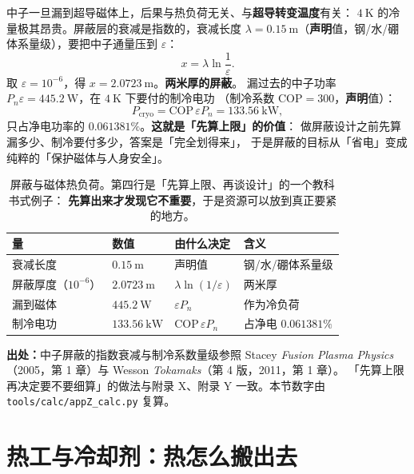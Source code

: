 中子一旦漏到超导磁体上，后果与热负荷无关、与\textbf{超导转变温度}有关：
$4\ \mathrm{K}$ 的冷量极其昂贵。屏蔽层的衰减是指数的，衰减长度
$\lambda=0.15\ \mathrm{m}$（\textbf{声明}值，钢/水/硼体系量级），要把中子通量压到 $\varepsilon$：
\begin{equation}
x = \lambda\ln\frac{1}{\varepsilon}.
\label{eq:app-z-shield}
\end{equation}
取 $\varepsilon=10^{-6}$，得 $x = 2.0723\ \mathrm{m}$。\textbf{两米厚的屏蔽}。
漏过去的中子功率 $P_n\varepsilon = 445.2\ \mathrm{W}$，在 $4\ \mathrm{K}$ 下要付的制冷电功
（制冷系数 $\mathrm{COP}=300$，\textbf{声明}值）：
\begin{equation}
P_{\mathrm{cryo}} = \mathrm{COP}\,\varepsilon P_n = 133.56\ \mathrm{kW},
\label{eq:app-z-cryo}
\end{equation}
只占净电功率的 $0.061381\%$。\textbf{这就是「先算上限」的价值}：
做屏蔽设计之前先算漏多少、制冷要付多少，答案是「完全划得来」，
于是屏蔽的目标从「省电」变成纯粹的「保护磁体与人身安全」。

\begin{table}[htbp]
\centering
\small
\caption{屏蔽与磁体热负荷。第四行是「先算上限、再谈设计」的一个教科书式例子：
\textbf{先算出来才发现它不重要}，于是资源可以放到真正要紧的地方。}
\label{tab:app-z-shield}
\begin{tabular}{p{3.4cm}p{3.2cm}p{3.1cm}p{3.4cm}}
\toprule
量 & 数值 & 由什么决定 & 含义 \\
\midrule
衰减长度 & $0.15\ \mathrm{m}$ & 声明值 & 钢/水/硼体系量级 \\
屏蔽厚度（$10^{-6}$） & $2.0723\ \mathrm{m}$ & $\lambda\ln(1/\varepsilon)$ & 两米厚 \\
漏到磁体 & $445.2\ \mathrm{W}$ & $\varepsilon P_n$ & 作为冷负荷 \\
制冷电功 & $133.56\ \mathrm{kW}$ & $\mathrm{COP}\,\varepsilon P_n$ & 占净电 $0.061381\%$ \\
\bottomrule
\end{tabular}

\end{table}

{\footnotesize
\textbf{出处：}中子屏蔽的指数衰减与制冷系数量级参照 Stacey \emph{Fusion Plasma
Physics}（2005，第 1 章）与 Wesson \emph{Tokamaks}（第 4 版，2011，第 1 章）。
「先算上限再决定要不要细算」的做法与附录 X、附录 Y 一致。本节数字由
\texttt{tools/\allowbreak{}calc/\allowbreak{}appZ\_calc.py} 复算。
}

\section{热工与冷却剂：热怎么搬出去}
\label{sec:app-z-thermal}

